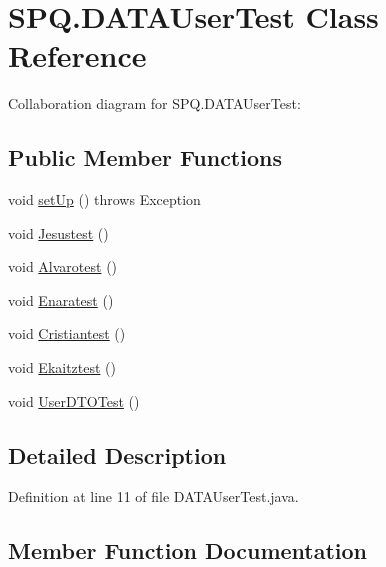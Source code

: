 \hypertarget{class_s_p_q_1_1_d_a_t_a_user_test}{}\section{S\+P\+Q.\+D\+A\+T\+A\+User\+Test Class Reference}
\label{class_s_p_q_1_1_d_a_t_a_user_test}


Collaboration diagram for S\+P\+Q.\+D\+A\+T\+A\+User\+Test\+:
\subsection*{Public Member Functions}
\begin{DoxyCompactItemize}
\item 
void \mbox{\hyperlink{class_s_p_q_1_1_d_a_t_a_user_test_a703753b88018d83f5a2d3b76d335889a}{set\+Up}} ()  throws Exception 
\item 
void \mbox{\hyperlink{class_s_p_q_1_1_d_a_t_a_user_test_a29a15c9122a588e854a02c6c2fe1d203}{Jesustest}} ()
\item 
void \mbox{\hyperlink{class_s_p_q_1_1_d_a_t_a_user_test_a9d47696cb1887a6d5712f0e9beae2182}{Alvarotest}} ()
\item 
void \mbox{\hyperlink{class_s_p_q_1_1_d_a_t_a_user_test_a84d1c3d3992383e1cb93d07241cf3f02}{Enaratest}} ()
\item 
void \mbox{\hyperlink{class_s_p_q_1_1_d_a_t_a_user_test_a7defc94d9391e6721dee5c627f75e1fb}{Cristiantest}} ()
\item 
void \mbox{\hyperlink{class_s_p_q_1_1_d_a_t_a_user_test_a04242b7156b6bb7828bd569de8027fad}{Ekaitztest}} ()
\item 
void \mbox{\hyperlink{class_s_p_q_1_1_d_a_t_a_user_test_a4feb113d2b2971c37851e1b6bddca741}{User\+D\+T\+O\+Test}} ()
\end{DoxyCompactItemize}


\subsection{Detailed Description}


Definition at line 11 of file D\+A\+T\+A\+User\+Test.\+java.



\subsection{Member Function Documentation}
\mbox{\label{class_s_p_q_1_1_d_a_t_a_user_test_a9d47696cb1887a6d5712f0e9beae2182}} 
